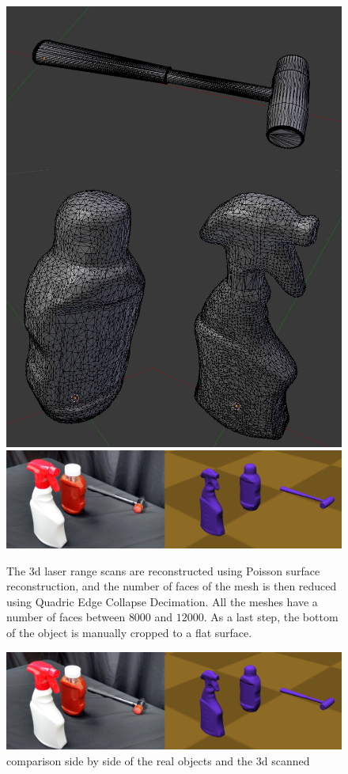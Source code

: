 \begin{figure}[!hbt]
\begin{center}
        \includegraphics[width=0.6\columnwidth]     {images/ssoch/meshes}
        \includegraphics[width=0.95\columnwidth]     {images/ssoch/objects}
        \caption{The 3d laser range scans are reconstructed using Poisson surface reconstruction, and the number of faces of the mesh is then reduced using Quadric Edge Collapse Decimation. All the meshes have a number of faces between $8000$ and $12000$. As a last step, the bottom of the object is manually cropped to a flat surface.}
        \label{meshes}
        \end{center}
\end{figure}

\begin{figure}[!hbt]
\begin{center}
        \includegraphics[width=0.95\columnwidth]     {images/ssoch/objects}
        \caption{comparison side by side of the real objects and the 3d scanned}
        \label{objects}
        \end{center}
\end{figure}



